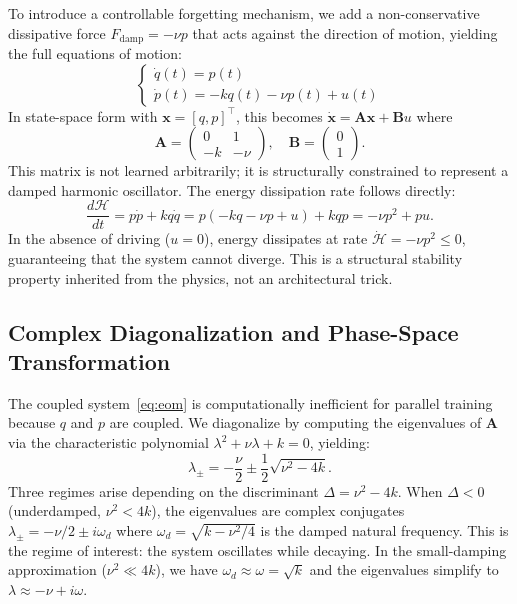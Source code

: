 \documentclass[11pt]{article}
\begin{document}
To introduce a controllable forgetting mechanism, we add a non-conservative dissipative force $F_\text{damp} = -\nu p$ that acts against the direction of motion, yielding the full equations of motion:
\begin{equation}
    \begin{cases}
    \dot{q}(t) = p(t) \\
    \dot{p}(t) = -kq(t) - \nu p(t) + u(t)
    \end{cases}
    \label{eq:eom}
\end{equation}
In state-space form with $\mathbf{x} = [q, p]^\top$, this becomes $\dot{\mathbf{x}} = \mathbf{A}\mathbf{x} + \mathbf{B}u$ where
\begin{equation}
    \mathbf{A} = \begin{pmatrix} 0 & 1 \\ -k & -\nu \end{pmatrix}, \quad \mathbf{B} = \begin{pmatrix} 0 \\ 1 \end{pmatrix}.
    \label{eq:ssm_matrix}
\end{equation}
This matrix is not learned arbitrarily; it is structurally constrained to represent a damped harmonic oscillator. The energy dissipation rate follows directly:
\begin{equation}
    \frac{d\mathcal{H}}{dt} = p\dot{p} + kq\dot{q} = p(-kq - \nu p + u) + kqp = -\nu p^2 + pu.
    \label{eq:energy_rate}
\end{equation}
In the absence of driving ($u = 0$), energy dissipates at rate $\dot{\mathcal{H}} = -\nu p^2 \leq 0$, guaranteeing that the system cannot diverge. This is a structural stability property inherited from the physics, not an architectural trick.

\subsection{Complex Diagonalization and Phase-Space Transformation}

The coupled system~\eqref{eq:eom} is computationally inefficient for parallel training because $q$ and $p$ are coupled. We diagonalize by computing the eigenvalues of $\mathbf{A}$ via the characteristic polynomial $\lambda^2 + \nu\lambda + k = 0$, yielding:
\begin{equation}
    \lambda_{\pm} = -\frac{\nu}{2} \pm \frac{1}{2}\sqrt{\nu^2 - 4k}.
    \label{eq:eigenvalues}
\end{equation}
Three regimes arise depending on the discriminant $\Delta = \nu^2 - 4k$. When $\Delta < 0$ (underdamped, $\nu^2 < 4k$), the eigenvalues are complex conjugates $\lambda_{\pm} = -\nu/2 \pm i\omega_d$ where $\omega_d = \sqrt{k - \nu^2/4}$ is the damped natural frequency. This is the regime of interest: the system oscillates while decaying. In the small-damping approximation ($\nu^2 \ll 4k$), we have $\omega_d \approx \omega = \sqrt{k}$ and the eigenvalues simplify to $\lambda \approx -\nu + i\omega$.
\end{document}
